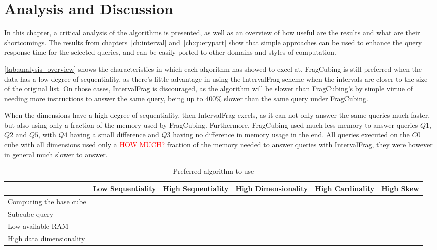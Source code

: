 
\chapter{Analysis and Discussion}\label{ch:analysis}

In this chapter, a critical analysis of the algorithms is presented, as well as an overview of how useful are the results and what are their shortcomings.
The results from chapters~\ref{ch:interval} and~\ref{ch:querypart} show that simple approaches can be used to enhance the query response time for the selected queries, and can be easily ported to other domains and styles of computation.

\autoref{tab:analysis_overview} shows the characteristics in which each algorithm has showed to excel at.
FragCubing is still preferred when the data has a low degree of sequentiality, as there's little advantage in using the IntervalFrag scheme when the intervals are closer to the size of the original list.
On those cases, IntervalFrag is discouraged, as the algorithm will be slower than FragCubing's by simple virtue of needing more instructions to answer the same query, being up to 400\% slower than the same query under FragCubing.

When the dimensions have a high degree of sequentiality, then IntervalFrag excels, as it can not only answer the same queries much faster, but also using only a fraction of the memory used by FragCubing.
Furthermore, FragCubing used much less memory to answer queries $Q1$, $Q2$ and $Q5$, with $Q4$ having a small difference and $Q3$ having no difference in memory usage in the end.
All queries executed on the $C0$ cube with all dimensions used only a \textcolor{red}{HOW MUCH?} fraction of the memory needed to answer queries with IntervalFrag, they were however in general much slower to answer.

\begin{table}[!ht]
  \begin{center}
    \caption{Preferred algorithm to use}\label{tab:analysis_overview}
    \footnotesize
    \begin{tabular}{|C{2.5cm}|C{2.3cm}|C{2.3cm}|C{2.8cm}|C{2cm}|C{1cm}|}
      \hline
      & \bfseries Low Sequentiality &\bfseries High Sequentiality &\bfseries High Dimensionality &\bfseries High Cardinality &\bfseries High Skew \\
      \hline
      Computing the base cube & & & & & \\
      \hline
      Subcube query& & & & & \\
      \hline
      Low available RAM& & & & & \\
      \hline
      High data dimensionality& & & & & \\
      \hline
    \end{tabular}
  \end{center}
\end{table}
\normalsize

